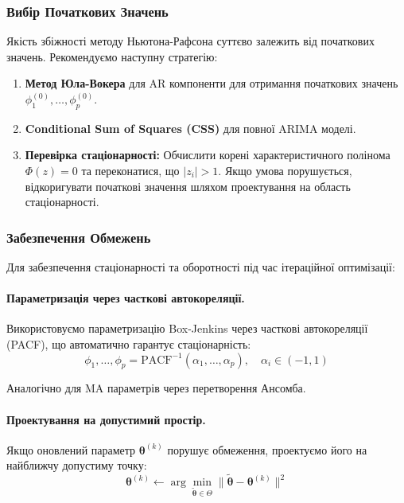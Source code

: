 \documentclass[12pt,a4paper]{article}
\begin{document}
	\subsubsection{Вибір Початкових Значень}
	
	Якість збіжності методу Ньютона-Рафсона суттєво залежить від початкових значень. Рекомендуємо наступну стратегію:
	
	\begin{enumerate}
		\item \textbf{Метод Юла-Вокера} для AR компоненти для отримання початкових значень $\phi_1^{(0)}, \ldots, \phi_p^{(0)}$.
		
		\item \textbf{Conditional Sum of Squares (CSS)} для повної ARIMA моделі.
		
		\item \textbf{Перевірка стаціонарності:} Обчислити корені характеристичного полінома $\Phi(z) = 0$ та переконатися, що $|z_i| > 1$. Якщо умова порушується, відкоригувати початкові значення шляхом проектування на область стаціонарності.
	\end{enumerate}
	
	\subsubsection{Забезпечення Обмежень}
	
	Для забезпечення стаціонарності та оборотності під час ітераційної оптимізації:
	
	\paragraph{Параметризація через часткові автокореляції.}
	
	Використовуємо параметризацію Box-Jenkins через часткові автокореляції (PACF), що автоматично гарантує стаціонарність:
	\begin{equation}
		\label{eq:pacf_parameterization}
		\phi_1, \ldots, \phi_p = \text{PACF}^{-1}(\alpha_1, \ldots, \alpha_p), \quad \alpha_i \in (-1, 1)
	\end{equation}
	
	Аналогічно для MA параметрів через перетворення Ансомба.
	
	\paragraph{Проектування на допустимий простір.}
	
	Якщо оновлений параметр $\boldsymbol{\theta}^{(k)}$ порушує обмеження, проектуємо його на найближчу допустиму точку:
	\begin{equation}
		\label{eq:projection}
		\boldsymbol{\theta}^{(k)} \leftarrow \arg\min_{\tilde{\boldsymbol{\theta}} \in \Theta} \|\tilde{\boldsymbol{\theta}} - \boldsymbol{\theta}^{(k)}\|^2
	\end{equation}
	
\end{document}
